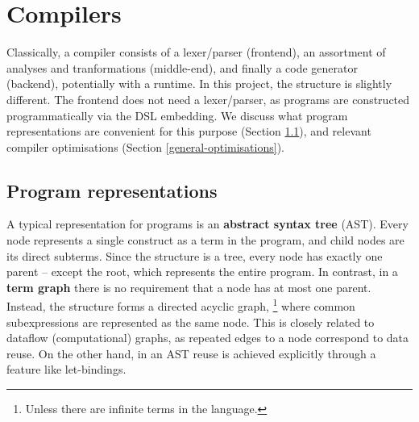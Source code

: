 

\section{Compilers}
\label{compiler-techniques}

Classically, a compiler consists of a lexer/parser (frontend), an assortment of analyses and tranformations (middle-end), and finally a code generator (backend), potentially with a runtime. In this project, the structure is slightly different. The frontend does not need a lexer/parser, as programs are constructed programmatically via the DSL embedding. We discuss what program representations are convenient for this purpose (Section \ref{representations}), and relevant compiler optimisations (Section \ref{general-optimisations}).

\subsection{Program representations} \label{representations}

A typical representation for programs is an \textbf{abstract syntax tree} (AST). 
Every node represents a single construct as a term in the program, and child nodes are its direct subterms. 
Since the structure is a tree, every node has exactly one parent -- except the root, which represents the entire program. 
In contrast, in a \textbf{term graph} there is no requirement that a node has at most one parent. 
Instead, the structure forms a directed acyclic graph,%
\footnote{Unless there are infinite terms in the language.
} where common subexpressions are represented as the same node. 
This is closely related to dataflow (computational) graphs, as repeated edges to a node correspond to data reuse. On the other hand, in an AST reuse is achieved explicitly through a feature like let-bindings.

